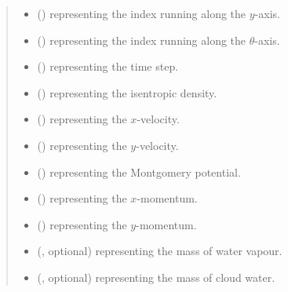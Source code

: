 \documentclass[letterpaper,10pt,english]{sphinxmanual}
\begin{document}
\begin{fulllineitems}
\begin{fulllineitems}
\begin{quote}
\begin{description}
\begin{itemize}
\item {} 
 () \textendash{}  representing the index running along the \(y\)-axis.

\item {} 
 () \textendash{}  representing the index running along the \(\theta\)-axis.

\item {} 
 () \textendash{}  representing the time step.

\item {} 
 () \textendash{}  representing the isentropic density.

\item {} 
 () \textendash{}  representing the \(x\)-velocity.

\item {} 
 () \textendash{}  representing the \(y\)-velocity.

\item {} 
 () \textendash{}  representing the Montgomery potential.

\item {} 
 () \textendash{}  representing the \(x\)-momentum.

\item {} 
 () \textendash{}  representing the \(y\)-momentum.

\item {} 
 (, optional) \textendash{}  representing the mass of water vapour.

\item {} 
 (, optional) \textendash{}  representing the mass of cloud water.


\end{itemize}
\end{description}
\end{quote}
\end{fulllineitems}
\end{fulllineitems}
\end{document}
